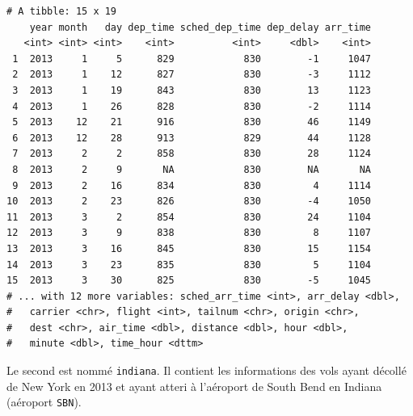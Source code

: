 \documentclass[a4paperpaper,]{article}
\newenvironment{Shaded}{\begin{snugshade}}{\end{snugshade}}
\newcommand{\KeywordTok}[1]{\textcolor[rgb]{0.12,0.11,0.11}{\textbf{#1}}}
\newcommand{\NormalTok}[1]{\textcolor[rgb]{0.12,0.11,0.11}{#1}}
\newcommand{\OperatorTok}[1]{\textcolor[rgb]{0.12,0.11,0.11}{#1}}
\newcommand{\StringTok}[1]{\textcolor[rgb]{0.75,0.01,0.01}{#1}}
\begin{document}
\begin{verbatim}
# A tibble: 15 x 19
    year month   day dep_time sched_dep_time dep_delay arr_time
   <int> <int> <int>    <int>          <int>     <dbl>    <int>
 1  2013     1     5      829            830        -1     1047
 2  2013     1    12      827            830        -3     1112
 3  2013     1    19      843            830        13     1123
 4  2013     1    26      828            830        -2     1114
 5  2013    12    21      916            830        46     1149
 6  2013    12    28      913            829        44     1128
 7  2013     2     2      858            830        28     1124
 8  2013     2     9       NA            830        NA       NA
 9  2013     2    16      834            830         4     1114
10  2013     2    23      826            830        -4     1050
11  2013     3     2      854            830        24     1104
12  2013     3     9      838            830         8     1107
13  2013     3    16      845            830        15     1154
14  2013     3    23      835            830         5     1104
15  2013     3    30      825            830        -5     1045
# ... with 12 more variables: sched_arr_time <int>, arr_delay <dbl>,
#   carrier <chr>, flight <int>, tailnum <chr>, origin <chr>,
#   dest <chr>, air_time <dbl>, distance <dbl>, hour <dbl>,
#   minute <dbl>, time_hour <dttm>
\end{verbatim}

Le second est nommé \texttt{indiana}. Il contient les informations des vols ayant décollé de New York en 2013 et ayant atteri à l'aéroport de South Bend en Indiana (aéroport \texttt{SBN}).

\begin{Shaded}
\end{Shaded}
\end{document}
